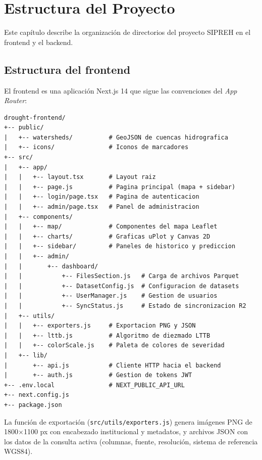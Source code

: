 \chapter{Estructura del Proyecto}
\label{ch:estructura}

Este capítulo describe la organización de directorios del proyecto SIPREH en el frontend y el backend.

\section{Estructura del frontend}
\label{sec:estructura_frontend}

El frontend es una aplicación Next.js 14 que sigue las convenciones del \textit{App Router}:

\begin{verbatim}
drought-frontend/
+-- public/
|   +-- watersheds/          # GeoJSON de cuencas hidrografica
|   +-- icons/               # Iconos de marcadores
+-- src/
|   +-- app/
|   |   +-- layout.tsx       # Layout raiz
|   |   +-- page.js          # Pagina principal (mapa + sidebar)
|   |   +-- login/page.tsx   # Pagina de autenticacion
|   |   +-- admin/page.tsx   # Panel de administracion
|   +-- components/
|   |   +-- map/             # Componentes del mapa Leaflet
|   |   +-- charts/          # Graficas uPlot y Canvas 2D
|   |   +-- sidebar/         # Paneles de historico y prediccion
|   |   +-- admin/
|   |       +-- dashboard/
|   |           +-- FilesSection.js   # Carga de archivos Parquet
|   |           +-- DatasetConfig.js  # Configuracion de datasets
|   |           +-- UserManager.js    # Gestion de usuarios
|   |           +-- SyncStatus.js     # Estado de sincronizacion R2
|   +-- utils/
|   |   +-- exporters.js     # Exportacion PNG y JSON
|   |   +-- lttb.js          # Algoritmo de diezmado LTTB
|   |   +-- colorScale.js    # Paleta de colores de severidad
|   +-- lib/
|       +-- api.js           # Cliente HTTP hacia el backend
|       +-- auth.js          # Gestion de tokens JWT
+-- .env.local               # NEXT_PUBLIC_API_URL
+-- next.config.js
+-- package.json
\end{verbatim}

\begin{remark}
La función de exportación (\texttt{src/utils/exporters.js}) genera imágenes PNG de 1800$\times$1100 px con encabezado institucional y metadatos, y archivos JSON con los datos de la consulta activa (columnas, fuente, resolución, sistema de referencia WGS84).
\end{remark}

